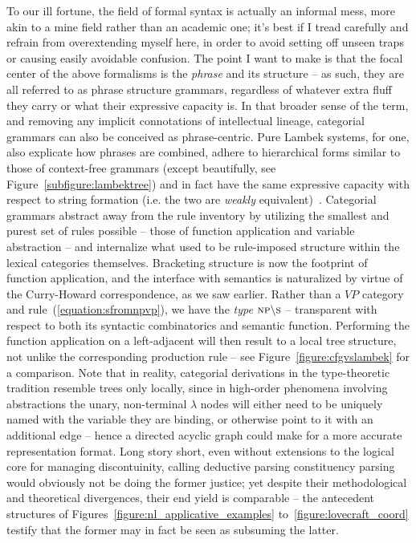 To our ill fortune, the field of formal syntax is actually an informal mess, more akin to a mine field rather than an academic one; it's best if I tread carefully and refrain from overextending myself here, in order to avoid setting off unseen traps or causing easily avoidable confusion.
The point I want to make is that the focal center of the above formalisms is the \textit{phrase} and its structure -- as such, they are all referred to as phrase structure grammars, regardless of whatever extra fluff they carry or what their expressive capacity is.
In that broader sense of the term, and removing any implicit connotations of intellectual lineage, categorial grammars can also be conceived as phrase-centric.
Pure Lambek systems, for one, also explicate how phrases are combined, adhere to hierarchical forms similar to those of context-free grammars (except beautifully, see Figure~\ref{subfigure:lambektree}) and in fact have the same expressive capacity with respect to string formation (i.e. the two are \textit{weakly} equivalent)~\cite{pentus1993lambek}.
Categorial grammars abstract away from the rule inventory by utilizing the smallest and purest set of rules possible -- those of function application and variable abstraction -- and internalize what used to be rule-imposed structure within the lexical categories themselves.
Bracketing structure is now the footprint of function application, and the interface with semantics is naturalized by virtue of the Curry-Howard correspondence, as we saw earlier.
Rather than a $VP$ category and rule~(\ref{equation:sfromnpvp}), we have the \textit{type} $\np[s]\divleft\s[s]$ -- transparent with respect to both its syntactic combinatorics and semantic function.
Performing the function application on a left-adjacent \np[s] will then result to a local tree structure, not unlike the corresponding production rule -- see Figure~\ref{figure:cfgvslambek} for a comparison.
Note that in reality, categorial derivations in the type-theoretic tradition resemble trees only locally, since in high-order phenomena involving abstractions the unary, non-terminal $\lambda$ nodes will either need to be uniquely named with the variable they are binding, or otherwise point to it  with an additional edge -- hence a directed acyclic graph could make for a more accurate representation format.
Long story short, even without extensions to the logical core for managing discontuinity, calling deductive parsing constituency parsing would obviously not be doing the former justice; yet despite their methodological and theoretical divergences, their end yield is comparable -- the antecedent structures of Figures~\ref{figure:nl_applicative_examples} to~\ref{figure:lovecraft_coord} testify that the former may in fact be seen as subsuming the latter.

